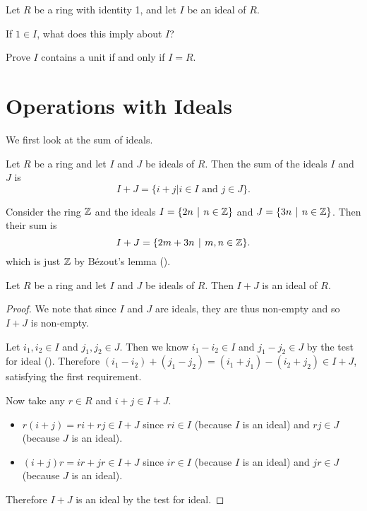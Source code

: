 \begin{exercise}\label{exercise-ideal-contains-unit-iff-ideal-is-whole-ring}
    Let $R$ be a ring with identity 1, and let $I$ be an ideal of $R$.
    \begin{partquestions}{\roman*}
        \item If $1 \in I$, what does this imply about $I$?
        \item Prove $I$ contains a unit if and only if $I = R$.
    \end{partquestions}
\end{exercise}

\section{Operations with Ideals}
We first look at the sum of ideals.

\begin{definition}
    Let $R$ be a ring and let $I$ and $J$ be ideals of $R$. Then the sum of the ideals $I$ and $J$ is
    \[
        I + J = \{i + j \vert i\in I \text{ and } j\in J\}.
    \]
\end{definition}

\begin{example}
    Consider the ring $\mathbb{Z}$ and the ideals $I = \{2n \vert n \in \Z\}$ and $J = \{3n \vert n \in \Z\}$. Then their sum is
    \[
        I + J = \{2m + 3n \vert m,n \in \Z\}.
    \]
    which is just $\mathbb{Z}$ by B\'ezout's lemma ().
\end{example}

\begin{proposition}\label{prop-sum-of-ideals-is-ideal}
    Let $R$ be a ring and let $I$ and $J$ be ideals of $R$. Then $I + J$ is an ideal of $R$.
\end{proposition}
\begin{proof}
    We note that since $I$ and $J$ are ideals, they are thus non-empty and so $I+J$ is non-empty.

    Let $i_1, i_2 \in I$ and $j_1, j_2 \in J$. Then we know $i_1 - i_2 \in I$ and $j_1 - j_2 \in J$ by the test for ideal (). Therefore $(i_1 - i_2) + (j_1 - j_2) = (i_1 + j_1) - (i_2 + j_2) \in I + J$, satisfying the first requirement.

    Now take any $r \in R$ and $i+j \in I+J$.
    \begin{itemize}
        \item $r(i+j) = ri + rj \in I+J$ since $ri \in I$ (because $I$ is an ideal) and $rj \in J$ (because $J$ is an ideal).
        \item $(i+j)r = ir + jr \in I+J$ since $ir \in I$ (because $I$ is an ideal) and $jr \in J$ (because $J$ is an ideal).
    \end{itemize}
    Therefore $I + J$ is an ideal by the test for ideal.
\end{proof}



